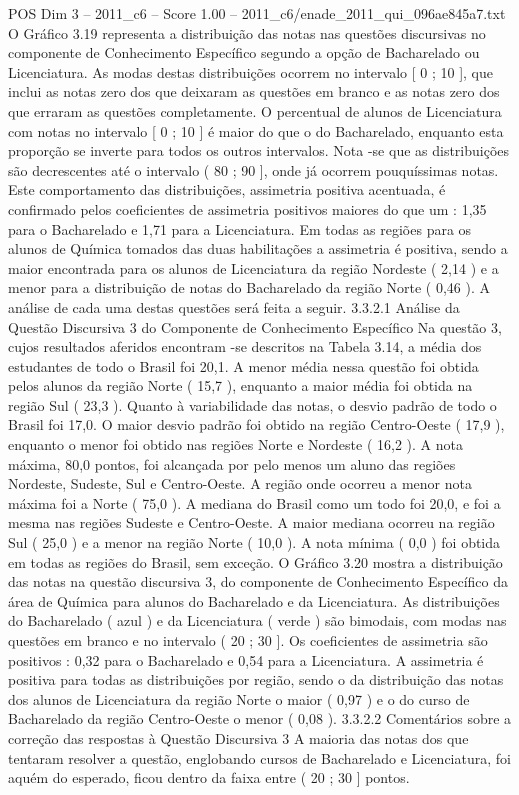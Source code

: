 \begin{textsample}{POS Dim 3 – 2011\_c6 – Score 1.00 – 2011\_c6/enade\_2011\_qui\_096ae845a7.txt}
O Gráfico 3.19 representa a distribuição das notas nas questões discursivas no componente de Conhecimento Específico segundo a opção de Bacharelado ou Licenciatura.
As modas destas distribuições ocorrem no intervalo [ 0 ; 10 ], que inclui as notas zero dos que deixaram as questões em branco e as notas zero dos que erraram as questões completamente.
O percentual de alunos de Licenciatura com notas no intervalo [ 0 ; 10 ] é maior do que o do Bacharelado, enquanto esta proporção se inverte para todos os outros intervalos.
Nota -se que as distribuições são decrescentes até o intervalo ( 80 ; 90 ], onde já ocorrem pouquíssimas notas.
Este comportamento das distribuições, assimetria positiva acentuada, é confirmado pelos coeficientes de assimetria positivos maiores do que um : 1,35 para o Bacharelado e 1,71 para a Licenciatura.
Em todas as regiões para os alunos de Química tomados das duas habilitações a assimetria é positiva, sendo a maior encontrada para os alunos de Licenciatura da região Nordeste ( 2,14 ) e a menor para a distribuição de notas do Bacharelado da região Norte ( 0,46 ).
A análise de cada uma destas questões será feita a seguir. 3.3.2.1 Análise da Questão Discursiva 3 do Componente de Conhecimento Específico Na questão 3, cujos resultados aferidos encontram -se descritos na Tabela 3.14, a média dos estudantes de todo o Brasil foi 20,1.
A menor média nessa questão foi obtida pelos alunos da região Norte ( 15,7 ), enquanto a maior média foi obtida na região Sul ( 23,3 ).
Quanto à variabilidade das notas, o desvio padrão de todo o Brasil foi 17,0.
O maior desvio padrão foi obtido na região Centro-Oeste ( 17,9 ), enquanto o menor foi obtido nas regiões Norte e Nordeste ( 16,2 ).
A nota máxima, 80,0 pontos, foi alcançada por pelo menos um aluno das regiões Nordeste, Sudeste, Sul e Centro-Oeste.
A região onde ocorreu a menor nota máxima foi a Norte ( 75,0 ).
A mediana do Brasil como um todo foi 20,0, e foi a mesma nas regiões Sudeste e Centro-Oeste.
A maior mediana ocorreu na região Sul ( 25,0 ) e a menor na região Norte ( 10,0 ).
A nota mínima ( 0,0 ) foi obtida em todas as regiões do Brasil, sem exceção.
O Gráfico 3.20 mostra a distribuição das notas na questão discursiva 3, do componente de Conhecimento Específico da área de Química para alunos do Bacharelado e da Licenciatura.
As distribuições do Bacharelado ( azul ) e da Licenciatura ( verde ) são bimodais, com modas nas questões em branco e no intervalo ( 20 ; 30 ].
Os coeficientes de assimetria são positivos : 0,32 para o Bacharelado e 0,54 para a Licenciatura.
A assimetria é positiva para todas as distribuições por região, sendo o da distribuição das notas dos alunos de Licenciatura da região Norte o maior ( 0,97 ) e o do curso de Bacharelado da região Centro-Oeste o menor ( 0,08 ). 3.3.2.2 Comentários sobre a correção das respostas à Questão Discursiva 3 A maioria das notas dos que tentaram resolver a questão, englobando cursos de Bacharelado e Licenciatura, foi aquém do esperado, ficou dentro da faixa entre ( 20 ; 30 ] pontos.

\end{textsample}
